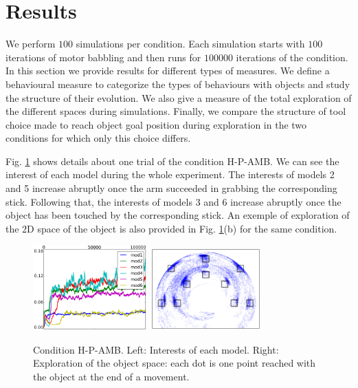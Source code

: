 \documentclass[10pt,letterpaper]{article}
\begin{document}
	
%


\section{Results}
	
	We perform $100$ simulations per condition. 
	Each simulation starts with $100$ iterations of motor babbling and then runs for $100000$ iterations of the condition.
	In this section we provide results for different types of measures. 
	We define a behavioural measure to categorize the types of behaviours with objects and study the structure of their evolution.
	We also give a measure of the total exploration of the different spaces during simulations.
	Finally, we compare the structure of tool choice made to reach object goal position during exploration in the two conditions for which only this choice differs.
		
	Fig. \ref{res_interests} shows details about one trial of the condition H-P-AMB. 
	We can see the interest of each model during the whole experiment.
	The interests of models 2 and 5 increase abruptly once the arm succeeded in grabbing the corresponding stick.
	Following that, the interests of models 3 and 6 increase abruptly once the object has been touched by the corresponding stick.
	An exemple of exploration of the $2$D space of the object is also provided in Fig. \ref{res_interests}(b) for the same condition.
	
	\begin{figure}[ht]
		\centering
		\hspace{-0.7cm}	
		\vspace{0pt}
		\includegraphics[width=4.4cm]{./include/H-RGB-P-AMB-log9-interests-100000.png}
		\hspace{-0.1cm}	
		\vspace{0pt}
		\includegraphics[width=4.26cm]{./include/obj-explo.pdf}
		\caption{Condition H-P-AMB. Left: Interests of each model. Right: Exploration of the object space: each dot is one point reached with the object at the end of a movement.}
		\label{res_interests}
	\end{figure}
\end{document}
